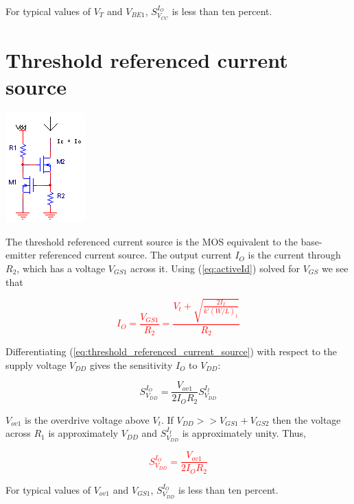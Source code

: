 \noindent For typical values of $V_{T}$ and $V_{BE1}$, $S_{{V}_{CC}}^{{I}_{O}}$ is less than ten percent.

\section{Threshold referenced current source}
\begin{center}
	\includegraphics{schematics/threshold_referenced_currentsource.PNG}
\end{center}
The threshold referenced current source is the MOS equivalent to the base-emitter referenced current source. The output current $I_{O}$ is the current through $R_{2}$, which has a voltage $V_{GS1}$ across it. Using (\ref{eq:activeId}) solved for $V_{GS}$ we see that

\textcolor{red}{
\begin{equation}
I_{O} = \frac{V_{GS1}}{R_{2}} = \frac{V_{t} + \sqrt{\frac{2I_{I}}{k'(W/L)_{1}}}}{R_{2}}
\label{eq:threshold_referenced_current_source}
\end{equation}
}

\noindent Differentiating (\ref{eq:threshold_referenced_current_source}) with respect to the supply voltage $V_{DD}$ gives the sensitivity $I_{O}$ to $V_{DD}$:

\begin{equation}
S_{{V}_{DD}}^{{I}_{O}} = \frac{V_{ov1}}{2I_{O}R_{2}}S_{{V}_{DD}}^{{I}_{I}}
\end{equation}

\noindent $V_{ov1}$ is the overdrive voltage above $V_{t}$. If $V_{DD} >> V_{GS1} + V_{GS2}$ then the voltage across $R_{1}$ is approximately $V_{DD}$ and $S_{{V}_{DD}}^{{I}_{I}}$ is approximately unity. Thus,

\textcolor{red}{
\begin{equation}
S_{{V}_{DD}}^{{I}_{O}} = \frac{V_{ov1}}{2I_{O}R_{2}}
\end{equation}
}

\noindent For typical values of $V_{ov1}$ and $V_{GS1}$, $S_{{V}_{DD}}^{{I}_{O}}$ is less than ten percent.

